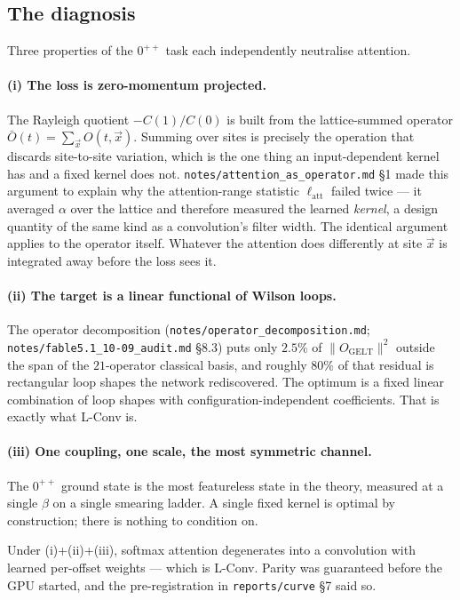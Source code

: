 \documentclass[11pt,a4paper]{article}
\begin{document}
\subsection{The diagnosis}

Three properties of the $0^{++}$ task each independently neutralise attention.

\paragraph{(i) The loss is zero-momentum projected.} The Rayleigh quotient
$-C(1)/C(0)$ is built from the lattice-summed operator
$\bar{O}(t) = \sum_{\vec{x}} O(t,\vec{x})$. Summing over sites is precisely the
operation that discards site-to-site variation, which is the one thing an
input-dependent kernel has and a fixed kernel does not.
\texttt{notes/attention\_as\_operator.md} \S1 made this argument to explain why
the attention-range statistic $\ell_{\mathrm{att}}$ failed twice --- it averaged
$\alpha$ over the lattice and therefore measured the learned \emph{kernel}, a
design quantity of the same kind as a convolution's filter width. The identical
argument applies to the operator itself. Whatever the attention does
differently at site $\vec{x}$ is integrated away before the loss sees it.

\paragraph{(ii) The target is a linear functional of Wilson loops.} The operator
decomposition (\texttt{notes/operator\_decomposition.md};
\texttt{notes/fable5.1\_10-09\_audit.md} \S8.3) puts only $2.5\%$ of
$\|O_{\mathrm{GELT}}\|^2$ outside the span of the $21$-operator classical basis,
and roughly $80\%$ of that residual is rectangular loop shapes the network
rediscovered. The optimum is a fixed linear combination of loop shapes with
configuration-independent coefficients. That is exactly what L-Conv is.

\paragraph{(iii) One coupling, one scale, the most symmetric channel.} The
$0^{++}$ ground state is the most featureless state in the theory, measured at a
single $\beta$ on a single smearing ladder. A single fixed kernel is optimal by
construction; there is nothing to condition on.

Under (i)+(ii)+(iii), softmax attention degenerates into a convolution with
learned per-offset weights --- which is L-Conv. Parity was guaranteed before the
GPU started, and the pre-registration in \texttt{reports/curve} \S7 said so.
\end{document}
